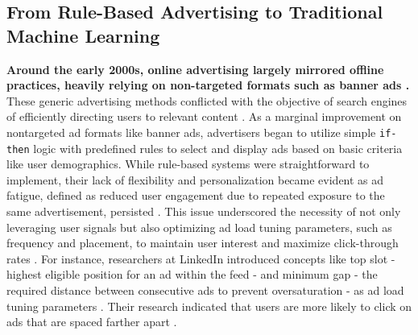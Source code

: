 \documentclass[final]{anthology-ch}         %
\begin{document}
\subsection{From Rule-Based Advertising to Traditional Machine Learning}
\textbf{Around the early 2000s, online advertising largely mirrored offline practices, heavily relying on non-targeted formats such as banner ads \cite{kant2021history}.} These generic advertising methods conflicted with the objective of search engines of efficiently directing users to relevant content \cite{fain2006sponsored}. As a marginal improvement on nontargeted ad formats like banner ads, advertisers began to utilize simple \texttt{if-then} logic with predefined rules to select and display ads based on basic criteria like user demographics. While rule-based systems were straightforward to implement, their lack of flexibility and personalization became evident as ad fatigue, defined as reduced user engagement due to repeated exposure to the same advertisement, persisted \cite{abrams2007personalized}. This issue underscored the necessity of not only leveraging user signals but also optimizing ad load tuning parameters, such as frequency and placement, to maintain user interest and maximize click-through rates \cite{abrams2007personalized}. For instance, researchers at LinkedIn introduced concepts like top slot - highest eligible position for an ad within the feed -  and minimum gap - the required distance between consecutive ads to prevent oversaturation - as ad load tuning parameters \cite{yan2020ads}. Their research indicated that users are more likely to click on ads that are spaced farther apart \cite{yan2020ads}. \\
\end{document}

